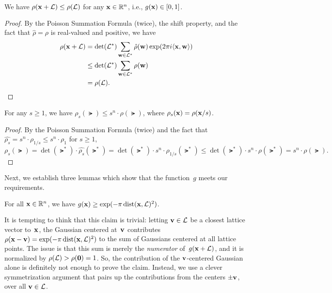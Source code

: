 \documentclass[11pt]{article}
\begin{document}
\begin{claim}
  \label{clm:gaussian-shift}
  We have $\rho(\mathbf{x} + \mathcal{L}) \leq \rho(\mathcal{L})$ for any $\mathbf{x} \in
  \mathbb{R}^n$, i.e., $g(\mathbf{x}) \in [0,1]$.
\end{claim}

\begin{proof}
  By the Poisson Summation Formula (twice), the shift property, and
  the fact that $\hat{\rho} = \rho$ is real-valued and positive, we
  have
  \begin{align*}
    \rho(\mathbf{x} + \mathcal{L})
    &= \det(\mathcal{L}^*) \sum_{\mathbf{w} \in \mathcal{L}^*} \hat{\rho}(\mathbf{w})\exp(2
      \pi i \langle\mathbf{x},\mathbf{w}\rangle ) \\
    &\leq \det(\mathcal{L}^*)\sum_{\mathbf{w} \in \mathcal{L}^*} \rho(\mathbf{w}) \\
    &=  \rho(\mathcal{L}).
  \end{align*}
\end{proof}

\begin{claim}
  \label{clm:gaussian-scale}
  For any $s \geq 1$, we have
  $\rho_s(\lat) \leq s^{n} \cdot \rho(\lat)$, where
  $\rho_s(\mathbf{x}) = \rho(\mathbf{x}/s)$.
\end{claim}

\begin{proof}
  By the Poisson Summation Formula (twice) and the fact that
  $\widehat{\rho_{s}} = s^{n} \cdot \rho_{1/s} \leq s^{n} \cdot
  \rho_{1}$ for $s \geq 1$,
  \[ \rho_s(\lat) = \det(\lat^*) \cdot \widehat{\rho_{s}}(\lat^*) =
    \det(\lat^{*}) \cdot s^{n} \cdot \rho_{1/s}(\lat^{*}) \leq
    \det(\lat^{*}) \cdot s^{n} \cdot \rho(\lat^{*}) = s^{n} \cdot
    \rho(\lat). \]
\end{proof}

\noindent Next, we establish three lemmas which show that the
function~$g$ meets our requirements.

\begin{lemma}
  \label{lem:g-close}
  For all $\mathbf{x} \in \mathbb{R}^{n}$, we have
  $g(\mathbf{x}) \geq \exp(-\pi \operatorname{dist}(\mathbf{x},\mathcal{L})^2)$.
\end{lemma}

It is tempting to think that this claim is trivial: letting
$\mathbf{v} \in \mathcal{L}$ be a closest lattice vector to~$\mathbf{x}$, the Gaussian
centered at~$\mathbf{v}$ contributes
$\rho(\mathbf{x}-\mathbf{v}) = \exp(-\pi \operatorname{dist}(\mathbf{x},\mathcal{L})^{2})$ to the sum of
Gaussians centered at all lattice points. The issue is that this sum
is merely the \emph{numerator} of~$g(\mathbf{x} + \mathcal{L})$, and it is
normalized by $\rho(\mathcal{L}) > \rho(\mathbf{0}) = 1$. So, the contribution
of the $\mathbf{v}$-centered Gaussian alone is definitely not enough to
prove the claim. Instead, we use a clever symmetrization argument that
pairs up the contributions from the centers $\pm \mathbf{v}$, over all
$\mathbf{v} \in \mathcal{L}$.
\end{document}
